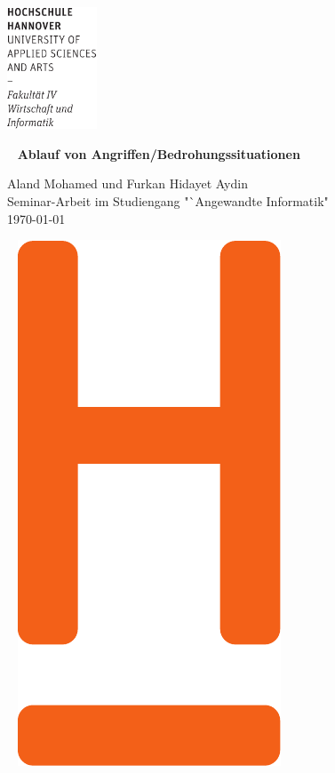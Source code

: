 \documentclass[12pt,DIV=14, version=first, BCOR=10mm,a4paper,twoside,parskip=half-,headsepline,headinclude]{scrartcl}
\begin{document}
  \thispagestyle{empty} %
\includegraphics[width=0.2\textwidth]{Wortmarke_WI_schwarz}

   {  ~ \sffamily
  \vfill
  {\Huge\bfseries Ablauf von Angriffen/Bedrohungssituationen}
  \bigskip

  {\Large 
   Aland Mohamed und Furkan Hidayet Aydin \\[2ex]
 Seminar-Arbeit im Studiengang "`Angewandte Informatik"
 \\[5ex]
   \today } 
}
 \vfill
  
  ~ \hfill
  \includegraphics[height=0.3\paperheight]{H_WI_Pantone1665} 

\vspace*{-3cm}
\end{document}
